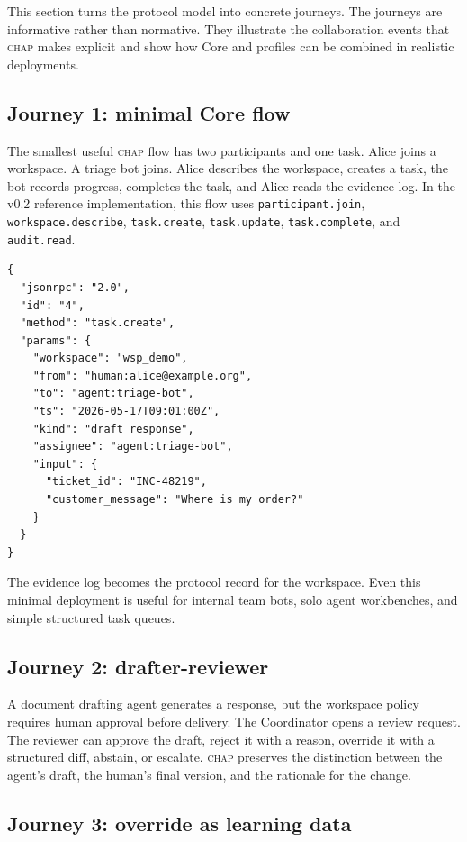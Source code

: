 \documentclass[11pt]{article}
\newcommand{\chap}{\textsc{chap}}
\begin{document}
This section turns the protocol model into concrete journeys. The journeys are informative rather than normative. They illustrate the collaboration events that \chap{} makes explicit and show how Core and profiles can be combined in realistic deployments.

\subsection{Journey 1: minimal Core flow}

The smallest useful \chap{} flow has two participants and one task. Alice joins a workspace. A triage bot joins. Alice describes the workspace, creates a task, the bot records progress, completes the task, and Alice reads the evidence log. In the v0.2 reference implementation, this flow uses \texttt{participant.join}, \texttt{workspace.describe}, \texttt{task.create}, \texttt{task.update}, \texttt{task.complete}, and \texttt{audit.read}.

\begin{lstlisting}[caption={Minimal Core task creation in the reference style.},label={lst:taskcreate}]
{
  "jsonrpc": "2.0",
  "id": "4",
  "method": "task.create",
  "params": {
    "workspace": "wsp_demo",
    "from": "human:alice@example.org",
    "to": "agent:triage-bot",
    "ts": "2026-05-17T09:01:00Z",
    "kind": "draft_response",
    "assignee": "agent:triage-bot",
    "input": {
      "ticket_id": "INC-48219",
      "customer_message": "Where is my order?"
    }
  }
}
\end{lstlisting}

The evidence log becomes the protocol record for the workspace. Even this minimal deployment is useful for internal team bots, solo agent workbenches, and simple structured task queues.

\subsection{Journey 2: drafter-reviewer}

A document drafting agent generates a response, but the workspace policy requires human approval before delivery. The Coordinator opens a review request. The reviewer can approve the draft, reject it with a reason, override it with a structured diff, abstain, or escalate. \chap{} preserves the distinction between the agent's draft, the human's final version, and the rationale for the change.

\subsection{Journey 3: override as learning data}
\end{document}
